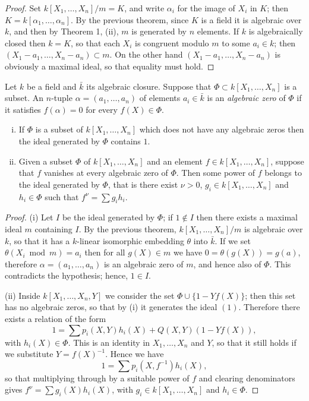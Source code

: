 \begin{proof}
Set $k[X_1, \ldots, X_n]/m = K$, and write $\alpha_i$ for the image of $X_i$ in $K$; then
$K = k[\alpha_1, \ldots, \alpha_n]$. By the previous theorem, since $K$ is a field it is algebraic
over $k$, and then by Theorem 1, (ii), $m$ is generated by $n$ elements. If $k$ is
algebraically closed then $k = K$, so that each $X_i$ is congruent modulo $m$ to
some $a_i \in k$; then $(X_1 - a_1, \ldots, X_n - a_n) \subset m$. On the other hand
$(X_1 - a_1, \ldots, X_n - a_n)$ is obviously a maximal ideal, so that equality must
hold.
\end{proof}

Let $k$ be a field and $\bar{k}$ its algebraic closure. Suppose that $\Phi \subset
k[X_1, \ldots, X_n]$ is a subset. An $n$-tuple $\alpha = (a_1, \ldots, a_n)$ of elements $a_i \in \bar{k}$ is an
\emph{algebraic zero} of $\Phi$ if it satisfies $f(\alpha) = 0$ for every $f(X) \in \Phi$.

\begin{theorem}\label{thm:5.4}
\begin{enumerate}[(i)]
  \item If $\Phi$ is a subset of $k[X_1, \ldots, X_n]$ which does not have any algebraic
        zeros then the ideal generated by $\Phi$ contains $1$.
  \item Given a subset $\Phi$ of $k[X_1, \ldots, X_n]$ and an element $f \in k[X_1, \ldots, X_n]$,
        suppose that $f$ vanishes at every algebraic zero of $\Phi$. Then some power of $f$
        belongs to the ideal generated by $\Phi$, that is there exist $\nu > 0$,
        $g_i \in k[X_1, \ldots, X_n]$ and $h_i \in \Phi$ such that $f^\nu = \sum g_i h_i$.
\end{enumerate}
\end{theorem}

\begin{proof}
(i) Let $I$ be the ideal generated by $\Phi$; if $1 \notin I$ then there exists a
maximal ideal $m$ containing $I$. By the previous theorem, $k[X_1, \ldots, X_n]/m$
is algebraic over $k$, so that it has a $k$-linear isomorphic embedding $\theta$ into
$\bar{k}$. If we set $\theta(X_i \bmod m) = a_i$ then for all $g(X) \in m$ we have $0 = \theta(g(X)) =
g(a)$, therefore $\alpha = (a_1, \ldots, a_n)$ is an algebraic zero of $m$, and
hence also of $\Phi$. This contradicts the hypothesis; hence, $1 \in I$.

(ii) Inside $k[X_1, \ldots, X_n, Y]$ we consider the set $\Phi \cup \{1 - Yf(X)\}$; then this
set has no algebraic zeros, so that by (i) it generates the ideal $(1)$. Therefore
there exists a relation of the form
\[
  1 = \sum p_i(X, Y)h_i(X) + Q(X, Y)(1 - Yf(X)),
\]
with $h_i(X) \in \Phi$. This is an identity in $X_1, \ldots, X_n$ and $Y$, so that it still holds if
we substitute $Y = f(X)^{-1}$. Hence we have
\[
  1 = \sum p_i(X, f^{-1})h_i(X),
\]
so that multiplying through by a suitable power of $f$ and clearing
denominators gives $f^\nu = \sum g_i(X)h_i(X)$, with $g_i \in k[X_1, \ldots, X_n]$ and
$h_i \in \Phi$.
\end{proof}

